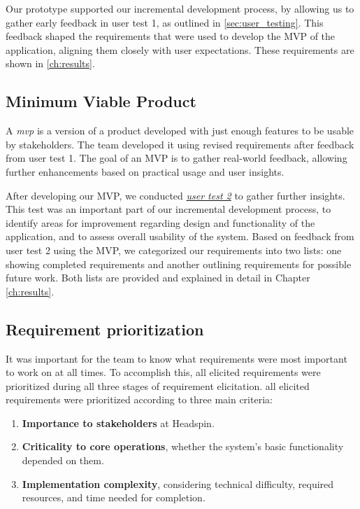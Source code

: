 Our prototype supported our incremental development process, by allowing us to gather early feedback in user test 1, as outlined in \autoref{sec:user_testing}. This feedback shaped the requirements that were used to develop the MVP of the application, aligning them closely with user expectations. These requirements are shown in \autoref{ch:results}.

\subsection{Minimum Viable Product}
\label{subsec:mvp}
A \textit{\acrfull{mvp}} is a version of a product developed with just enough features to be usable by  stakeholders. The team developed it using revised requirements after feedback from user test 1. The goal of an MVP is to gather real-world feedback, allowing further enhancements based on practical usage and user insights.

After developing our MVP, we conducted \textit{\hyperref[sec:user_testing]{user test 2}} to gather further insights. This test was an important part of our incremental development process, to identify areas for improvement regarding design and functionality of the application, and to assess overall usability of the system. Based on feedback from user test 2 using the MVP, we categorized our requirements into two lists: one showing completed requirements and another outlining requirements for possible future work. Both lists are provided and explained in detail in Chapter \ref{ch:results}.

\subsection{Requirement prioritization}
\label{subsec:req_prio}
It was important for the team to know what requirements were most important to work on at all times. To accomplish this, all elicited requirements were prioritized during all three stages of requirement elicitation.  all elicited requirements were prioritized according to three main criteria:

\begin{enumerate}
    \item \textbf{Importance to stakeholders} at Headspin.
    \item \textbf{Criticality to core operations}, whether the system’s basic functionality depended on them.
    \item \textbf{Implementation complexity}, considering technical difficulty, required resources, and time needed for completion.
\end{enumerate}

